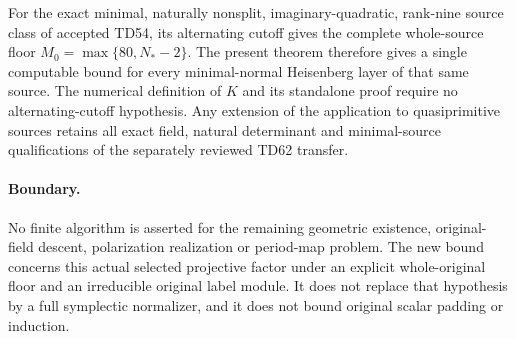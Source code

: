 For the exact minimal, naturally nonsplit, imaginary-quadratic,
rank-nine source class of accepted TD54, its alternating cutoff
gives the complete whole-source floor
\(M_0=\max\{80,N_*-2\}\).  The present theorem therefore gives a
single computable bound for every minimal-normal Heisenberg layer
of that same source.  The numerical definition of \(K\) and its
standalone proof require no alternating-cutoff hypothesis.
Any extension of the application to quasiprimitive sources retains
all exact field, natural determinant and minimal-source qualifications
of the separately reviewed TD62 transfer.

\paragraph{Boundary.}
No finite algorithm is asserted for the remaining geometric existence,
original-field descent, polarization realization or period-map problem.
The new bound concerns this actual selected projective factor under
an explicit whole-original floor and an irreducible original label
module.  It does not replace that hypothesis by a full symplectic
normalizer, and it does not bound original scalar padding or induction.
